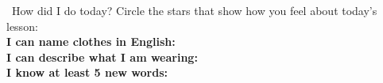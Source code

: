 \vspace{1em}
\begin{grammartip}{ \ How did I do today?}
  Circle the stars that show how you feel about today's lesson:\\[6pt]
  \textbf{I can name clothes in English:} \selfcheck[0] \\[4pt]
  \textbf{I can describe what I am wearing:} \selfcheck[0] \\[4pt]
  \textbf{I know at least 5 new words:} \selfcheck[0]
\end{grammartip}
